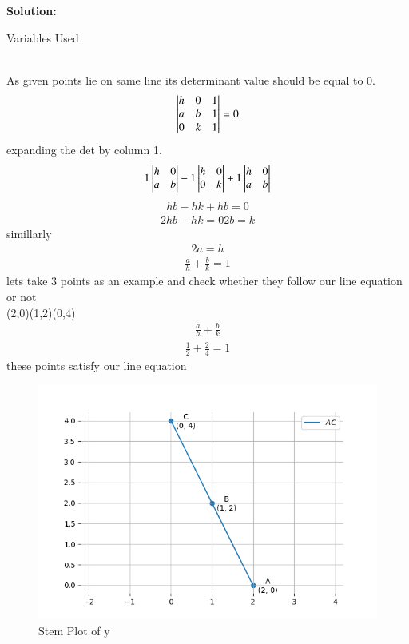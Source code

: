 \documentclass[journal]{IEEEtran}
\begin{document}
\textbf{Solution: }
\begin{table}[h!]    
  \centering
  
  \caption{Variables Used}
  \label{tab10.5.3.9.1}
\end{table}\\
As given points lie on same line its determinant value should be equal to 0.
\begin{align}
 \begin{vmatrix}h & 0 & 1 \\ a & b & 1 \\ 0 & k & 1\end{vmatrix} = 0 \label{1.6.9.1}
\end{align}
expanding the det by column 1.
\begin{align}
 1\begin{vmatrix}h & 0 \\ a & b\end{vmatrix} - 1\begin{vmatrix} h & 0 \\ 0 & k \end{vmatrix} + 1\begin{vmatrix} h & 0 \\ a & b \end{vmatrix}
\end{align}
\begin{align}
 hb - hk + hb = 0
\end{align}
\begin{align}
 2hb - hk = 0
 2b=k
\end{align}
simillarly 
\begin{align}
 2a=h
\end{align}
\begin{align}
 \frac{a}{h} + \frac{b}{k} = 1
\end{align}
lets take 3 points as an example and check whether they follow our line equation or not \\
(2,0)(1,2)(0,4)
\begin{align}
 \frac{a}{h} + \frac{b}{k}  
\end{align}
\begin{align}
 \frac{1}{2} + \frac{2}{4}  =  1
\end{align}
these points satisfy our line equation
\begin{figure}[h!]
   \centering
   \includegraphics[width=0.7\linewidth]{figs/fig2.png}
   \caption{Stem Plot of y}
   \label{stemplot}
\end{figure}
\end{document}
